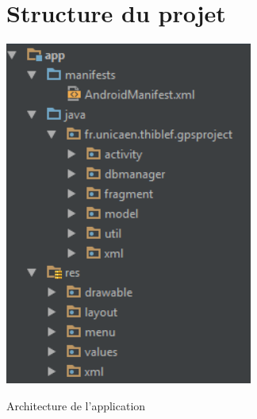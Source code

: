 \section{Structure du projet}
\bigskip
\begin{multicols}{2}
\begin{img}
  \includegraphics[scale=0.5]{img/archi.png}
  \caption{Architecture de l'application}
\end{img}


\end{multicols}
